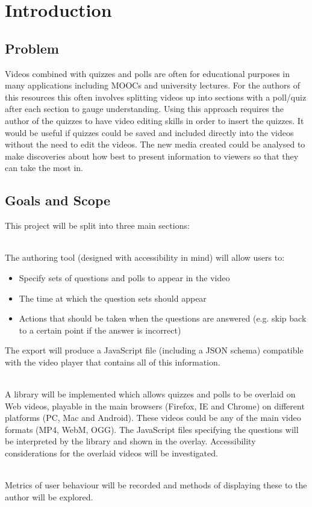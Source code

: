 \chapter{Introduction} 
\label{Chapter:Introduction}
\section{Problem} 
\label{Section:Problem}
Videos combined with quizzes and polls are often for educational purposes in many applications including \glspl{MOOC} and university lectures. For the authors of this resources this often involves splitting videos up into sections with a poll/quiz after each section to gauge understanding. Using this approach requires the author of the quizzes to have video editing skills in order to insert the quizzes. It would be useful if quizzes could be saved and included directly into the videos without the need to edit the videos. The new media created could be analysed to make discoveries about how best to present information to viewers so that they can take the most in. 

\section{Goals and Scope} 
\label{Section:Goals and Scope}
This project will be split into three main sections:
\begin{description}[%
  before={\setcounter{descriptcount}{0}},%
  ,font=\bfseries\stepcounter{descriptcount}\thedescriptcount~]
\item[Quiz Authoring Tool] \hfill \\
The authoring tool (designed with accessibility in mind) will allow users to:
\begin{itemize}
\item Specify sets of questions and polls to appear in the video
\item The time at which the question sets should appear
\item Actions that should be taken when the questions are answered (e.g. skip back to a certain point if the answer is incorrect)
\end{itemize}
The export will produce a JavaScript file (including a JSON schema) compatible with the video player that contains all of this information. 
\item[Overlaid Video Player] \hfill \\
A library will be implemented which allows quizzes and polls to be overlaid on Web videos, playable in the main browsers (Firefox, IE and Chrome) on different platforms (PC, Mac and Android). These videos could be any of the main video formats (MP4, WebM, OGG). The JavaScript files specifying the questions will be interpreted by the library and shown in the overlay. Accessibility considerations for the overlaid videos will be investigated.
\item[Video and Quiz Analytics] \hfill \\
Metrics of user behaviour will be recorded and methods of displaying these to the author will be explored.
\end{description}